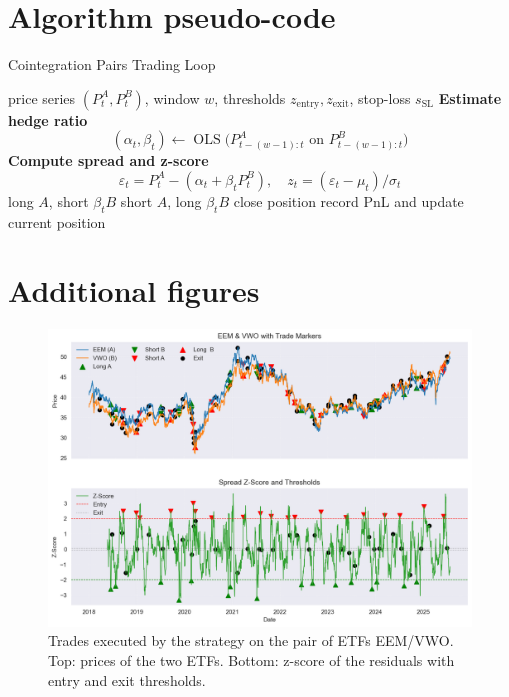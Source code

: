 \documentclass{article}
\begin{document}
\section{Algorithm pseudo-code}
\begin{algorithm}[h!tbp]
\caption{Cointegration Pairs Trading Loop}
\label{alg:pairs}
\begin{algorithmic}[1]
\Require price series $(P^A_t, P^B_t)$, window $w$,
         thresholds $z_{\text{entry}}, z_{\text{exit}}$,
         stop-loss $s_{\text{SL}}$
\Statex
{}
    \State \textbf{Estimate hedge ratio}
          \[
            (\alpha_t, \beta_t) \gets
            \operatorname{OLS}\bigl(P^{A}_{t-(w-1):t}
            \text{ on } P^{B}_{t-(w-1):t}\bigr)
          \]
    \State \textbf{Compute spread and z-score}
          \[
            \varepsilon_t = P^A_t - (\alpha_t + \beta_t P^B_t),\quad
            z_t = (\varepsilon_t - \mu_t)/\sigma_t
          \]
            \State long $A$, short $\beta_t B$
            \State short $A$, long $\beta_t B$
        \EndIf
    \Else
            \State close position
        \EndIf
    \EndIf
    \State record PnL and update current position
\EndFor
\end{algorithmic}
\end{algorithm}
\newpage
\section{Additional figures}
\begin{figure}[htbp]
\centering
\includegraphics[width=\linewidth]{eem_vwo_trades.png}
\caption{Trades executed by the strategy on the pair of ETFs EEM/VWO. Top: prices of the two ETFs. Bottom: z-score of the residuals with entry and exit thresholds.}
\label{fig:trades_eem_vwo}
\end{figure}

\printbibliography
\end{document}
